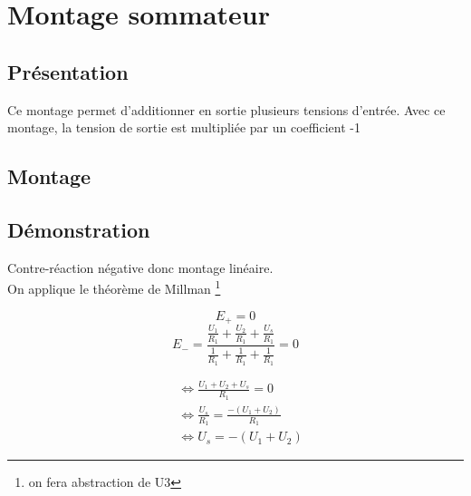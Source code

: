\chapter{Montage sommateur}

\section{Présentation}
Ce montage permet d'additionner en sortie plusieurs tensions d’entrée. Avec ce montage, la tension de sortie est multipliée par un coefficient -1

\section{Montage}

\section{Démonstration}

Contre-réaction négative donc montage linéaire. \\
On applique le théorème de Millman \footnote{on fera abstraction de U3}

$$E_+=0$$
$$ E_- = \frac{ \frac{U_1}{R_1} + \frac{U_2}{R_1} + \frac{U_s}{R_1} }{\frac{1}{R_1} + \frac{1}{R_1} + \frac{1}{R_1}}=0$$

\begin{align}
&\Leftrightarrow \frac{U_1+U_2+U_s}{R_1}=0 \\
&\Leftrightarrow \frac{U_s}{R_1} = \frac{-(U_1+U_2)}{R_1} \\
&\Leftrightarrow U_s = -(U_1+U_2)
\end{align}

